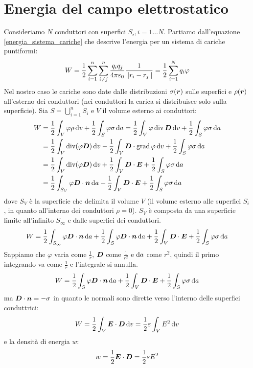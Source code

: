 \section{Energia del campo elettrostatico}
Consideriamo $N$ conduttori con superfici $S_i, i=1\ldots N$. Partiamo dall'equazione \eqref{energia_sistema_cariche} che descrive l'energia per un sistema di cariche puntiformi:
\begin{equation}
W=\frac{1}{2}\sum_{i=1}^n\sum_{i\neq j}^n\frac{q_iq_j}{4\pi\varepsilon_0}\frac{1}{\left\lVert r_i-r_j\right\rVert}=\frac{1}{2}\sum_{i=1}^{N}q_i\varphi
\end{equation}
Nel nostro caso le cariche sono date dalle distribuzioni $\sigma(\boldsymbol{r})$ sulle superfici e $\rho(\boldsymbol{r})$ all'esterno dei conduttori (nei conduttori la carica si distribuisce solo sulla superficie). Sia $S=\bigcup_{i=1}^n S_i$ e $V$ il volume esterno ai conduttori:
\begin{equation}
\begin{split}
W&=\frac{1}{2}\int_V\varphi\rho\,\mathrm{d} v+\frac{1}{2}\int_S\varphi\sigma\,\mathrm{d} a=
\frac{1}{2}\int_V\varphi\operatorname{div}\boldsymbol{D}\,\mathrm{d} v+\frac{1}{2}\int_S\varphi\sigma\,\mathrm{d} a\\
&=\frac{1}{2}\int_V\operatorname{div}(\varphi\boldsymbol{D})\,\mathrm{d} v-\frac{1}{2}\int_V\boldsymbol{D}\cdot\operatorname{grad}\varphi\,\mathrm{d} v+\frac{1}{2}\int_S\varphi\sigma\,\mathrm{d} a\\
&=\frac{1}{2}\int_V\operatorname{div}(\varphi\boldsymbol{D})\,\mathrm{d} v+\frac{1}{2}\int_V\boldsymbol{D}\cdot\boldsymbol{E}+\frac{1}{2}\int_S\varphi\sigma\,\mathrm{d} a\\
&=\frac{1}{2}\int_{S_V}\varphi\boldsymbol{D}\cdot\boldsymbol{n}\,\mathrm{d} a+\frac{1}{2}\int_V\boldsymbol{D}\cdot\boldsymbol{E}+\frac{1}{2}\int_S\varphi\sigma\,\mathrm{d} a
\end{split}
\end{equation}
dove $S_V$ è la superficie che delimita il volume $V$ (il volume esterno alle superfici $S_i$, in quanto all'interno dei conduttori $\rho=0$). $S_V$ è composta da una superficie limite all'infinito $S_\infty$ e dalle superfici dei conduttori.
\begin{equation}
W=\frac{1}{2}\int_{S_\infty}\varphi\boldsymbol{D}\cdot\boldsymbol{n}\,\mathrm{d} a+\frac{1}{2}\int_{S}\varphi\boldsymbol{D}\cdot\boldsymbol{n}\,\mathrm{d} a+\frac{1}{2}\int_V\boldsymbol{D}\cdot\boldsymbol{E}+\frac{1}{2}\int_S\varphi\sigma\,\mathrm{d} a
\end{equation}
Sappiamo che $\varphi$ varia come $\frac{1}{r}$, $\boldsymbol{D}$ come $\frac{1}{r^2}$ e $\mathrm{d} a$ come $r^2$, quindi il primo integrando va come $\frac{1}{r}$ e l'integrale si annulla.
\begin{equation}
W=\frac{1}{2}\int_{S}\varphi\boldsymbol{D}\cdot\boldsymbol{n}\,\mathrm{d} a+\frac{1}{2}\int_V\boldsymbol{D}\cdot\boldsymbol{E}+\frac{1}{2}\int_S\varphi\sigma\,\mathrm{d} a
\end{equation}
ma $\boldsymbol{D}\cdot\boldsymbol{n}=-\sigma$ in quanto le normali sono dirette verso l'interno delle superfici conduttrici:
\begin{equation}
W=\frac{1}{2}\int_V\boldsymbol{E}\cdot\boldsymbol{D}\,\mathrm{d} v=\frac{1}{2}\varepsilon\int_V E^2\,\mathrm{d} v
\end{equation}
e la densità di energia $w$:
\begin{equation}
w=\frac{1}{2}\boldsymbol{E}\cdot\boldsymbol{D}=\frac{1}{2}\varepsilon E^2
\end{equation}





